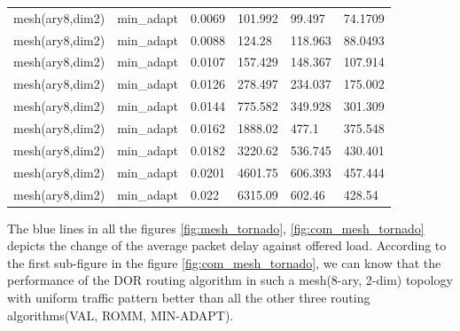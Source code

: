 \begin{longtable}[H]{llllll}
mesh(ary8,dim2) & min\_adapt                  & 0.0069 & 101.992 & 99.497  & 74.1709 \\
mesh(ary8,dim2) & min\_adapt                  & 0.0088 & 124.28  & 118.963 & 88.0493 \\
mesh(ary8,dim2) & min\_adapt                  & 0.0107 & 157.429 & 148.367 & 107.914 \\
mesh(ary8,dim2) & min\_adapt                  & 0.0126 & 278.497 & 234.037 & 175.002 \\
mesh(ary8,dim2) & min\_adapt                  & 0.0144 & 775.582 & 349.928 & 301.309 \\
mesh(ary8,dim2) & min\_adapt                  & 0.0162 & 1888.02 & 477.1   & 375.548 \\
mesh(ary8,dim2) & min\_adapt                  & 0.0182 & 3220.62 & 536.745 & 430.401 \\
mesh(ary8,dim2) & min\_adapt                  & 0.0201 & 4601.75 & 606.393 & 457.444 \\
mesh(ary8,dim2) & min\_adapt                  & 0.022  & 6315.09 & 602.46  & 428.54 
\end{longtable}



The blue lines in all the figures \ref{fig:mesh_tornado}, \ref{fig:com_mesh_tornado} depicts the change of the average packet delay against offered load. According to the first sub-figure in the figure \ref{fig:com_mesh_tornado}, we can know that the performance of the DOR routing algorithm in such a mesh(8-ary, 2-dim) topology with uniform traffic pattern better than all the other three routing algorithms(VAL, ROMM, MIN-ADAPT).


